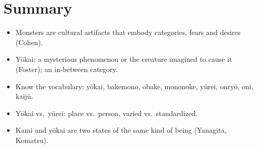 \section*{Summary}
\begin{itemize}
  \item Monsters are cultural artifacts that embody categories, fears and desires (Cohen).
  \item Yōkai: a mysterious phenomenon or the creature imagined to cause it (Foster);
        an in-between category.
  \item Know the vocabulary: yōkai, bakemono, obake, mononoke, yūrei, onryō, oni, kaijū.
  \item Yōkai vs.\ yūrei: place vs.\ person, varied vs.\ standardized.
  \item Kami and yōkai are two states of the same kind of being (Yanagita, Komatsu).
\end{itemize}
